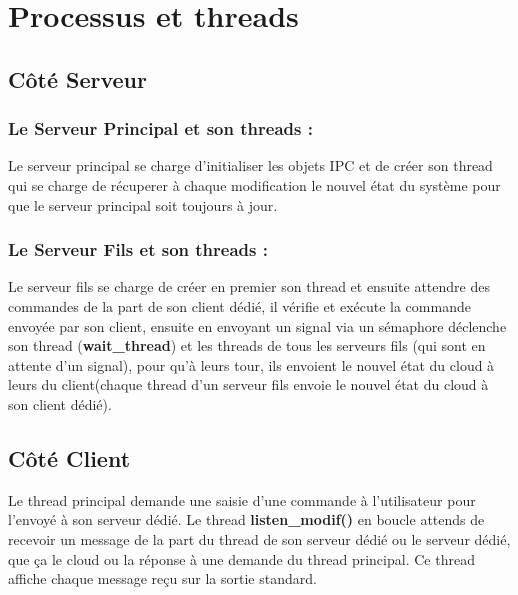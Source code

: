 \documentclass[oneside,13pt,a4paper]{article}
\begin{document}
\section{Processus et threads }

\subsection{Côté Serveur  }
\subsubsection{Le Serveur Principal et son threads : }
Le serveur principal se charge d'initialiser les objets IPC et de créer son thread qui se charge de récuperer à chaque modification le nouvel état du système pour que le serveur principal soit toujours à jour.
\subsubsection{Le Serveur Fils et son threads : }
Le serveur fils se charge de créer en premier son thread et ensuite attendre des commandes de la part de son client dédié, il vérifie et exécute la commande envoyée par son client, ensuite en envoyant un signal via un sémaphore déclenche son thread (\textbf{wait\_thread}) et les threads de tous les serveurs fils (qui sont en attente d'un signal), pour qu'à leurs tour, ils envoient le nouvel état du cloud à leurs du client(chaque thread d'un serveur fils envoie le nouvel état du cloud à son client dédié).



\subsection{Côté Client  }
Le thread principal demande une saisie d'une commande à l'utilisateur pour l'envoyé à son serveur dédié. 
Le thread \textbf{listen\_modif()} en boucle attends de recevoir un message de la part du thread de son serveur dédié ou le serveur dédié, que ça le cloud ou la réponse à une demande du thread principal.
Ce thread affiche chaque message reçu sur la sortie standard.
\end{document}
